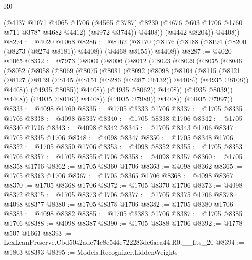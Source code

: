 \begin{lexlean}{R0}
\begin{coremodule}
              (@4137
                @1071
                @4065
                @1706
                (@4565 @3787)
                @8230
                (@4676 @603 @1706 @1760 @711 @3787 @4682 @4412)
                (@4972 @3744))
              @4408))
          (@4442 @8204))
        @4408))
@8274 := @4020 @1068
@8286 := @8162
    (@8170 (@8176 (@8188 (@8194 (@8200 (@8273 (@8274 @8181)) @4408)) (@4468 @8155)) @4408))
@8287 := @4020 @1065
@8332 := @7973
    (@8000
      (@8006
        (@8012
          (@8023
            (@8029
              (@8035
                (@8046
                  (@8052
                    (@8058
                      (@8069
                        (@8075
                          (@8081
                            (@8092
                              (@8098
                                (@8104
                                  (@8115
                                    (@8121
                                      (@8127
                                        (@8139
                                          (@8145 (@8151 (@8286 (@8287 @8132)) @4408))
                                          (@4935 @8108))
                                        @4408))
                                    (@4935 @8085))
                                  @4408))
                              (@4935 @8062))
                            @4408))
                        (@4935 @8039))
                      @4408))
                  (@4935 @8016))
                @4408))
            (@4935 @7989))
          @4408))
      (@4935 @7997))
@8333 := @4098 @1760
@8335 := @1705 @8333 @1706
@8337 := @1705 @8335 @1706
@8338 := @4098 @8337
@8340 := @1705 @8338 @1706
@8342 := @1705 @8340 @1706
@8343 := @4098 @8342
@8345 := @1705 @8343 @1706
@8347 := @1705 @8345 @1706
@8348 := @4098 @8347
@8350 := @1705 @8348 @1706
@8352 := @1705 @8350 @1706
@8353 := @4098 @8352
@8355 := @1705 @8353 @1706
@8357 := @1705 @8355 @1706
@8358 := @4098 @8357
@8360 := @1705 @8358 @1706
@8362 := @1705 @8360 @1706
@8363 := @4098 @8362
@8365 := @1705 @8363 @1706
@8367 := @1705 @8365 @1706
@8368 := @4098 @8367
@8370 := @1705 @8368 @1706
@8372 := @1705 @8370 @1706
@8373 := @4098 @8372
@8375 := @1705 @8373 @1706
@8377 := @1705 @8375 @1706
@8378 := @4098 @8377
@8380 := @1705 @8378 @1706
@8382 := @1705 @8380 @1706
@8383 := @4098 @8382
@8385 := @1705 @8383 @1706
@8387 := @1705 @8385 @1706
@8388 := @4098 @8387
@8390 := @1705 @8388 @1706
@8392 := @1778 @507 @1663
@8393 := LexLeanPreserve.Cbd5042ade74c8e544e722283de6aea44.R0.__fits_20
@8394 := @1803 @8393
@8395 := Models.Recognizer.hiddenWeights

\end{coremodule}
\end{lexlean}
